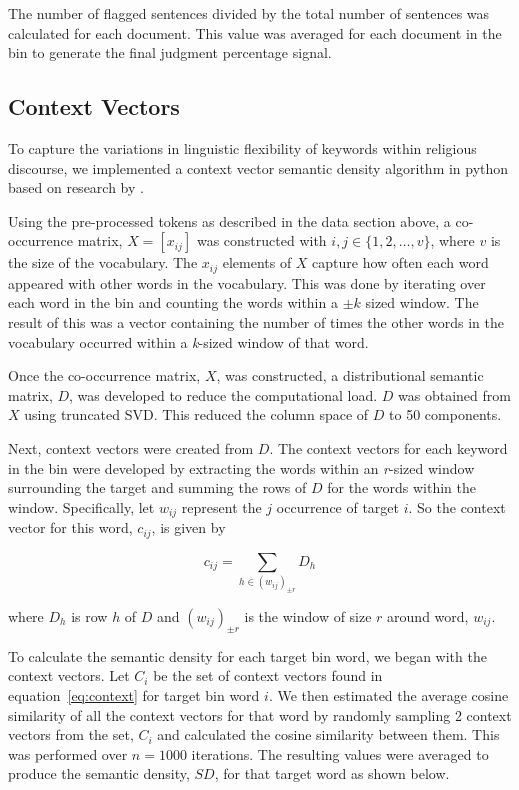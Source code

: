 \documentclass[11pt, a4paper]{article}
\begin{document}
The number of flagged sentences divided by the total number of sentences was calculated for each document. This value was averaged for each document in the bin to generate the final judgment percentage signal.

\subsection{Context Vectors}
\label{subsect:contextvectors}

To capture the variations in linguistic flexibility of keywords within religious discourse, we implemented a context vector semantic density algorithm in python based on research by . 

Using the pre-processed tokens as described in the data section above, a co-occurrence matrix, $X = [x_{ij}]$ was constructed with $i,j \in \{1,2,\ldots, v\}$, where $v$ is the size of the vocabulary. The $x_{ij}$ elements of $X$ capture how often each word appeared with other words in the vocabulary. This was done by iterating over each word in the bin and counting the words within a $\pm k$ sized window. The result of this was a vector containing the number of times the other words in the vocabulary occurred within a \textit{k}-sized window of that word.  

Once the co-occurrence matrix, $X$, was constructed, a distributional semantic matrix, $D$, was developed to reduce the computational load. $D$ was obtained from $X$ using truncated SVD. This reduced the column space of $D$ to 50 components. 

Next, context vectors were created from $D$. The context vectors for each keyword in the bin were developed by extracting the words within an \textit{r}-sized window surrounding the target and summing the rows of $D$ for the words within the window.  Specifically, let $w_{ij}$ represent the $j$ occurrence of target $i$. So the context vector for this word, $c_{ij}$, is given by 

\begin{equation}
\label{eq:context}
c_{ij}=\sum_{h \in (w_{ij})_{\pm r}} D_{h}
\end{equation}

\noindent where $D_{h}$ is  row $h$ of $D$ and $(w_{ij})_{\pm r}$ is the window of size $r$ around word, $w_{ij}$. 

To calculate the semantic density for each target bin word, we began with the context vectors. Let $C_{i}$ be the set of context vectors found in equation~\ref{eq:context} for target bin word $i$. We then estimated the average cosine similarity of all the context vectors for that word by randomly sampling 2 context vectors from the set, $C_{i}$ and calculated the cosine similarity between them. This was performed over $n=1000$ iterations. The resulting values were averaged to produce the semantic density, $SD$, for that target word as shown below.
\end{document}

